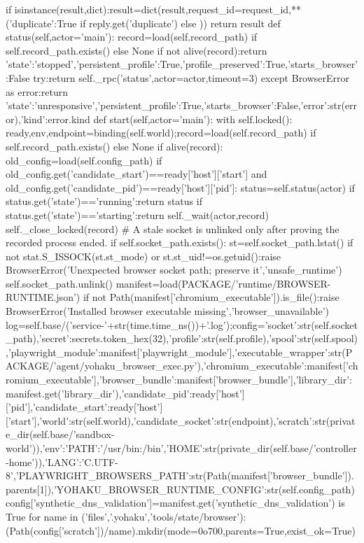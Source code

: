   if isinstance(result,dict):result=dict(result,request_id=request_id,**({'duplicate':True} if reply.get('duplicate') else {}))
  return result
 def status(self,actor='main'):
  record=load(self.record_path) if self.record_path.exists() else None
  if not alive(record):return {'state':'stopped','persistent_profile':True,'profile_preserved':True,'starts_browser':False}
  try:return self._rpc('status',actor=actor,timeout=3)
  except BrowserError as error:return {'state':'unresponsive','persistent_profile':True,'starts_browser':False,'error':str(error),'kind':error.kind}
 def start(self,actor='main'):
  with self.locked():
   ready,env,endpoint=binding(self.world);record=load(self.record_path) if self.record_path.exists() else None
   if alive(record):
    old_config=load(self.config_path)
    if old_config.get('candidate_start')==ready['host']['start'] and old_config.get('candidate_pid')==ready['host']['pid']:
     status=self.status(actor)
     if status.get('state')=='running':return status
     if status.get('state')=='starting':return self._wait(actor,record)
    self._close_locked(record)
   # A stale socket is unlinked only after proving the recorded process ended.
   if self.socket_path.exists():
    st=self.socket_path.lstat()
    if not stat.S_ISSOCK(st.st_mode) or st.st_uid!=os.getuid():raise BrowserError('Unexpected browser socket path; preserve it','unsafe_runtime')
    self.socket_path.unlink()
   manifest=load(PACKAGE/'runtime/BROWSER-RUNTIME.json')
   if not Path(manifest['chromium_executable']).is_file():raise BrowserError('Installed browser executable missing','browser_unavailable')
   log=self.base/('service-'+str(time.time_ns())+'.log');config={'socket':str(self.socket_path),'secret':secrets.token_hex(32),'profile':str(self.profile),'spool':str(self.spool),'playwright_module':manifest['playwright_module'],'executable_wrapper':str(PACKAGE/'agent/yohaku_browser_exec.py'),'chromium_executable':manifest['chromium_executable'],'browser_bundle':manifest['browser_bundle'],'library_dir':manifest.get('library_dir'),'candidate_pid':ready['host']['pid'],'candidate_start':ready['host']['start'],'world':str(self.world),'candidate_socket':str(endpoint),'scratch':str(private_dir(self.base/'sandbox-world')),'env':{'PATH':'/usr/bin:/bin','HOME':str(private_dir(self.base/'controller-home')),'LANG':'C.UTF-8','PLAYWRIGHT_BROWSERS_PATH':str(Path(manifest['browser_bundle']).parents[1]),'YOHAKU_BROWSER_RUNTIME_CONFIG':str(self.config_path)}}
   config['synthetic_dns_validation']=manifest.get('synthetic_dns_validation') is True
   for name in ('files','.yohaku','tools/state/browser'):(Path(config['scratch'])/name).mkdir(mode=0o700,parents=True,exist_ok=True)

